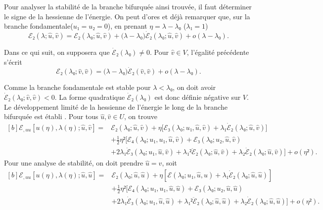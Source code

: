 \documentclass[12pt, final]{scrartcl}
\theoremstyle{definition}
\begin{document}
Pour analyser la stabilité de la branche bifurquée ainsi trouvée, il faut
déterminer le signe de la hessienne de l'énergie. On peut d'ores et déjà
remarquer que, sur la branche fondamentale(\(u₁ = u₂ = 0\)), en prenant
\(η = λ - λ₀\) (\(λ₁ = 1\))
\begin{equation}
 ℰ₂(λ; \hat{u}, \hat{v}) = ℰ₂(λ₀; \hat{u}, \hat{v}) + \bigl(λ - λ₀\bigr) \dot{ℰ}₂(λ₀; \hat{u}, \hat{v}) + o(λ - λ₀).
\end{equation}

Dans ce qui suit, on supposera que \(\dot{ℰ}₂(λ₀) ≠ 0\). Pour \(\hat{v}∈V\),
l'égalité précédente s'écrit
\begin{equation}
 ℰ₂(λ₀; \hat{v}, \hat{v}) = \bigl(λ - λ₀\bigr)\dot{ℰ}₂(\hat{v}, \hat{v}) + o(λ - λ₀).
\end{equation}

Comme la branche fondamentale est stable pour \(λ < λ₀\), on doit avoir
\(\dot{ℰ}₂(λ₀ ; \hat{v}, \hat{v}) < 0\). La forme quadratique \(\dot{ℰ}₂(λ₀)\)
est donc définie négative sur \(V\). Le développement limité de la hessienne de
l'énergie le long de la branche bifurquée est établi . Pour tous \(\hat{u}, \hat{v}∈U\), on trouve
\begin{equation}
  \label{eq:20220531054247}
  \begin{aligned}[b]
    ℰ_{, uu}[u(η), λ(η); \hat{u}, \hat{v}] ={}
    & ℰ₂(λ₀ ; \hat{u}, \hat{v}) + η \bigl[ℰ₃(λ₀ ; u₁, \hat{u}, \hat{v})  + λ₁ \dot{ℰ}₂(λ₀; \hat{u}, \hat{v})\bigr]\\
    & + \tfrac{1}{2} η² \bigl[ℰ₄(λ₀; u₁, u₁, \hat{u}, \hat{v}) + ℰ₃(λ₀; u₂, \hat{u}, \hat{v}) \\
    & + 2 λ₁ \dot{ℰ}₃(λ₀; u₁, \hat{u}, \hat{v}) + λ₁² \ddot{ℰ}₂(λ₀; \hat{u}, \hat{v}) + λ₂ \dot{ℰ}₂(λ₀; \hat{u}, \hat{v}) \bigr] + o(η²).
  \end{aligned}
\end{equation}
Pour une analyse de stabilité, on doit prendre \(\hat{u} = \hat{v}\), soit
\begin{equation}
  \begin{aligned}[b]
    \label{eq:20220531054218}
    ℰ_{, uu}[u(η), λ(η) ; \hat{u}, \hat{u}] ={}
    & ℰ₂(λ₀; \hat{u}, \hat{u}) + η [ℰ(λ₀; u₁, \hat{u}, \hat{u}) + λ₁ \dot{ℰ}₂ (λ₀; \hat{u}, \hat{u})]\\
    & + \tfrac{1}{2} η² \bigl[ℰ₄(λ₀; u₁, u₁, \hat{u}, \hat{u}) +ℰ₃(λ₀; u₂, \hat{u}, \hat{u})\\
    & + 2 λ₁ \dot{ℰ}₃(λ₀; u₁, \hat{u}, \hat{u}) + λ₁² \ddot{ℰ}₂(λ₀; \hat{u}, \hat{u})  + λ₂ \dot{ℰ}₂(λ₀; \hat{u}, \hat{u})\bigr] + o(η²) .
  \end{aligned}
\end{equation}
\end{document}
